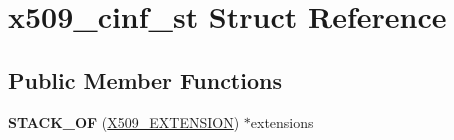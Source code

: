 \hypertarget{structx509__cinf__st}{}\section{x509\+\_\+cinf\+\_\+st Struct Reference}
\label{structx509__cinf__st}
\subsection*{Public Member Functions}
\begin{DoxyCompactItemize}
\item 
\mbox{\label{structx509__cinf__st_a52555b9f3c8734d431ac95712f68c13e}} 
{\bfseries S\+T\+A\+C\+K\+\_\+\+OF} (\hyperlink{struct_x509__extension__st}{X509\+\_\+\+E\+X\+T\+E\+N\+S\+I\+ON}) $\ast$extensions
\end{DoxyCompactItemize}
